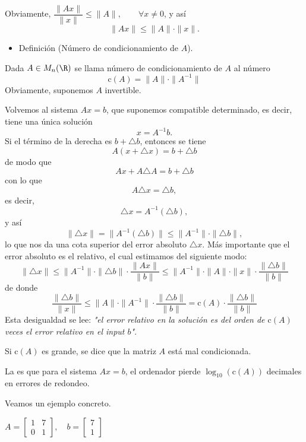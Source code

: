 Obviamente, $\dfrac{\|Ax\|}{\|x\|}\le\|A\|,\qquad\forall x\neq0$, y así \[ \|Ax\|\le\|A\|\cdot\|x\|. \]
\begin{itemize}[label=\color{red}\textbullet, leftmargin=*]
	\item \color{lightblue}Definición (Número de condicionamiento de $A$).
\end{itemize}
Dada $A\in M_n(\R)$ se llama número de condicionamiento de $A$ al número \[ \mathrm{c}(A)=\|A\|\cdot\|A^{-1}\| \]Obviamente, suponemos $A$ invertible.

Volvemos al sistema $Ax=b$, que suponemos compatible determinado, es decir, tiene una única solución \[ x=A^{-1}b. \]Si el término de la derecha es $b+\triangle b$, entonces se tiene \[ A(x+\triangle x)=b+\triangle b \] de modo que \[ Ax+A\triangle A=b+\triangle b \]con lo que \[ A\triangle x=\triangle b, \]es decir, \[ \triangle x=A^{-1}(\triangle b), \]y así \[ \|\triangle x\|=\|A^{-1}(\triangle b)\|\le \|A^{-1}\|\cdot\|\triangle b\|, \]lo que nos da una cota superior del error absoluto $\triangle x$. Más importante que el error absoluto es el relativo, el cual estimamos del siguiente modo: \[ \|\triangle x\|\le\|A^{-1}\|\cdot\|\triangle b\|\cdot\dfrac{\|Ax\|}{\|b\|}\le\|A^{-1}\|\cdot\|A\|\cdot\|x\|\cdot\dfrac{\|\triangle b\|}{\|b\|} \] de donde \[ \dfrac{\|\triangle b\|}{\|x\|}\le\|A\|\cdot\|A^{-1}\|\cdot\dfrac{\|\triangle b\|}{\|b\|}=\mathrm{c}(A)\cdot\dfrac{\|\triangle b\|}{\|b\|} \]
Esta desigualdad se lee: \emph{"el error relativo en la solución es del orden de $\mathrm{c}(A)$ veces el error relativo en el input $b$"}.

Si $\mathrm{c}(A)$ es grande, se dice que la matriz $A$ está mal condicionada.

La  es que para el sistema $Ax=b$, el ordenador pierde $\log_{10}(\mathrm{c}(A))$ decimales en errores de redondeo.


Veamos un ejemplo concreto.

\Ej

$A=\begin{bmatrix}
	1 & 7\\
	0 & 1
\end{bmatrix},\quad b=\begin{bmatrix}
7\\
1
\end{bmatrix}$

